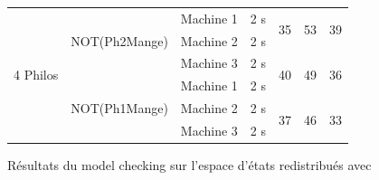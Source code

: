 \begin{tableth}
\begin{tabular}{|c|c|c||c||c|c|c|}
		\multirow{6}{*}{4 Philos} &  \multirow{3}{*}{\tiny NOT(Ph2Mange)}  & Machine 1 &    2 s    & \multirow{2}{*}{35} & \multirow{2}{*}{53} & \multirow{2}{*}{39} \\ \cline{3-4}
		                          &                                        & Machine 2 &    2 s    &                     &                     &                     \\ \cline{3-7}
		                          &                                        & Machine 3 &    2 s    & \multirow{2}{*}{40} & \multirow{2}{*}{49} & \multirow{2}{*}{36} \\ \cline{2-4}
		                          &  \multirow{3}{*}{\tiny NOT(Ph1Mange)}  & Machine 1 &    2 s    & &                     &                     \\ \cline{3-7}
		                          &                                        & Machine 2 &    2 s    &  \multirow{2}{*}{37} & \multirow{2}{*}{46} & \multirow{2}{*}{33} \\ \cline{3-4}
		                          &                                        & Machine 3 &   2 s    &                     &                     &                     \\ \hline\hline
	\end{tabular}
	\caption{Résultats du model checking sur l'espace d'états redistribués avec \textbf{\CDS{}} }\label{tableau2}
\end{tableth}


\def\lasty{}


